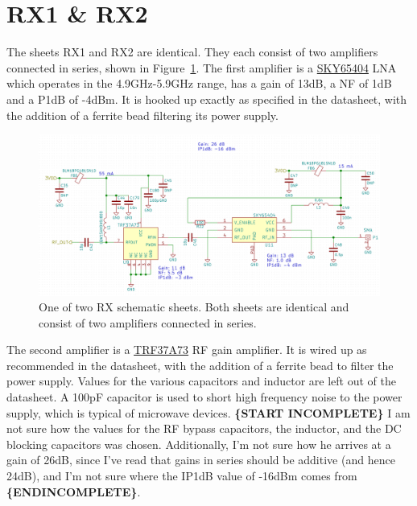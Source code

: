 \section{RX1 \& RX2}

The sheets RX1 and RX2 are identical. They each consist of two amplifiers connected in series, shown
in Figure~\ref{fig:rx-sch}. The first amplifier is a
\href{http://www.skyworksinc.com/uploads/documents/SKY65404_31_201512J.pdf}{SKY65404} LNA which
operates in the 4.9GHz-5.9GHz range, has a gain of 13dB, a NF of 1dB and a P1dB of -4dBm. It is
hooked up exactly as specified in the datasheet, with the addition of a ferrite bead filtering its
power supply.

\begin{figure}[h]
  \centering
  \includegraphics[width=\textwidth]{data/rx-sch.png}
  \caption{One of two RX schematic sheets. Both sheets are identical and consist of two amplifiers
    connected in series.}
  \label{fig:rx-sch}
\end{figure}

The second amplifier is a \href{http://www.ti.com/lit/ds/symlink/trf37a73.pdf}{TRF37A73} RF gain
amplifier. It is wired up as recommended in the datasheet, with the addition of a ferrite bead to
filter the power supply. Values for the various capacitors and inductor are left out of the
datasheet. A 100pF capacitor is used to short high frequency noise to the power supply, which is
typical of microwave devices. \textbf{\{START INCOMPLETE\}} I am not sure how the values for the RF
bypass capacitors, the inductor, and the DC blocking capacitors was chosen. Additionally, I'm not
sure how he arrives at a gain of 26dB, since I've read that gains in series should be additive (and
hence 24dB), and I'm not sure where the IP1dB value of -16dBm comes from \textbf{\{ENDINCOMPLETE\}}.